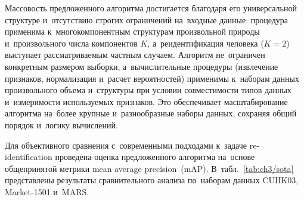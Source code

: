Массовость предложенного алгоритма достигается благодаря его
универсальной структуре и~отсутствию строгих ограничений на~входные
данные: процедура применима к~многокомпонентным структурам произвольной
природы и~произвольного числа компонентов $K$, а~реидентификация
человека ($K=2$) выступает рассматриваемым частным случаем. Алгоритм не~ограничен конкретным размером выборки,
а~вычислительные процедуры (извлечение признаков, нормализация
и~расчет вероятностей) применимы к~наборам данных произвольного
объема и~структуры при условии совместимости типов данных
и~измеримости используемых признаков. Это обеспечивает
масштабирование алгоритма на~более крупные и~разнообразные наборы данных,
сохраняя общий порядок и~логику вычислений.

Для объективного сравнения с~современными подходами к~задаче
re-identification проведена оценка предложенного алгоритма
на~основе общепринятой метрики mean average precision~(mAP).
В~табл.~\ref{tab:ch3/sota} представлены результаты сравнительного
анализа по~наборам данных CUHK03, Market-1501 и~MARS.

